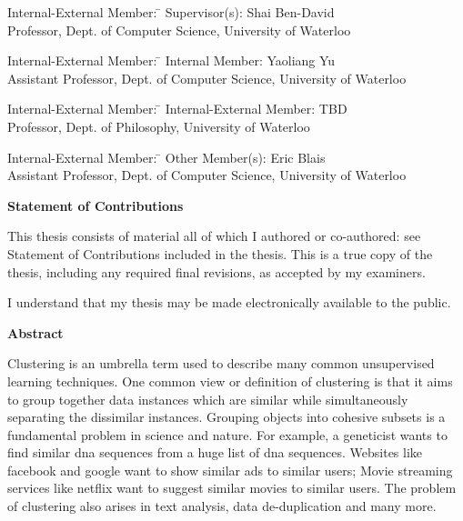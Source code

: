 \documentclass[letterpaper,12pt,titlepage,oneside,final]{book}
\let\origdoublepage\cleardoublepage
\newcommand{\clearemptydoublepage}{%
  \clearpage{\pagestyle{empty}\origdoublepage}}
\let\cleardoublepage\clearemptydoublepage
\begin{document}
  \noindent
\begin{tabbing}
Internal-External Member: \=  \kill %
Supervisor(s): \> Shai Ben-David \\
\> Professor, Dept. of Computer Science, University of Waterloo \\
\end{tabbing}
  \bigskip
  
  \noindent
  \begin{tabbing}
Internal-External Member: \=  \kill %
Internal Member: \> Yaoliang Yu \\
\> Assistant Professor, Dept. of Computer Science, University of Waterloo \\
\end{tabbing}
  \bigskip
  
  \noindent
\begin{tabbing}
Internal-External Member: \=  \kill %
Internal-External Member: \> TBD \\
\> Professor, Dept. of Philosophy, University of Waterloo \\
\end{tabbing}
  \bigskip
  
  \noindent
\begin{tabbing}
Internal-External Member: \=  \kill %
Other Member(s): \> Eric Blais \\
\> Assistant Professor, Dept. of Computer Science, University of Waterloo \\
\end{tabbing}

\cleardoublepage

\begin{center}\textbf{Statement of Contributions}\end{center}
  \noindent
This thesis consists of material all of which I authored or co-authored:  see Statement of
Contributions included in the thesis. This is a true copy of the thesis, including any required final revisions, as accepted by my examiners.

  \bigskip
  
  \noindent
I understand that my thesis may be made electronically available to the public.

\cleardoublepage

\begin{center}\textbf{Abstract}\end{center}
Clustering is an umbrella term used to describe many common unsupervised learning techniques. One common view or definition of clustering is that it aims to group together data instances which are similar while simultaneously separating the dissimilar instances. Grouping objects into cohesive subsets is a fundamental problem in science and nature. For example, a geneticist wants to find similar dna sequences from a huge list of dna sequences. Websites like facebook and google want to show similar ads to similar users; Movie streaming services like netflix want to suggest similar movies to similar users. The problem of clustering also arises in text analysis, data de-duplication and many more.  
\end{document}
